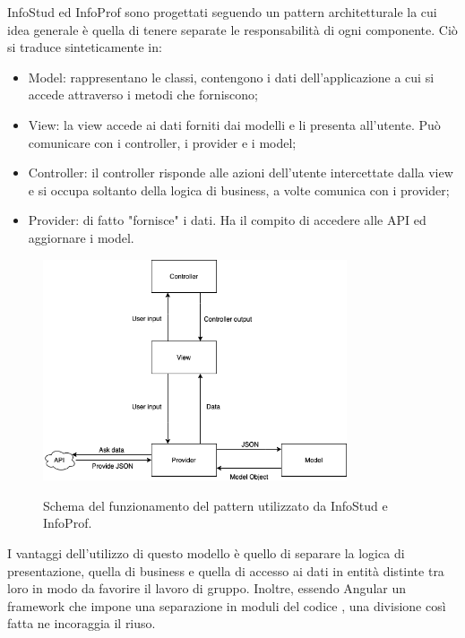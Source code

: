 \documentclass[Lau, oneside, noexaminfo]{sapthesis}%
\begin{document}
InfoStud ed InfoProf sono progettati seguendo un pattern architetturale la cui idea generale è quella di tenere separate le responsabilità di ogni componente. Ciò si traduce sinteticamente in:
\begin{itemize}
	\item Model: rappresentano le classi, contengono i dati dell'applicazione a cui si accede attraverso i metodi che forniscono;
	\item View: la view accede ai dati forniti dai modelli e li presenta all'utente. Può comunicare con i controller, i provider e i model;
	\item Controller: il controller risponde alle azioni dell'utente intercettate dalla view e si occupa soltanto della logica di business, a volte comunica con i provider;
	\item Provider: di fatto "fornisce" i dati. Ha il compito di accedere alle API ed aggiornare i model.
\end{itemize}

\begin{figure}[H]
	\caption{Schema del funzionamento del pattern utilizzato da InfoStud e InfoProf.}
	\centering
	\includegraphics[width=0.8\textwidth]{arch-pattern-img}
	\label{fig:pattern}
\end{figure}

I vantaggi dell'utilizzo di questo modello è quello di separare la logica di presentazione, quella di business e quella di accesso ai dati in entità distinte tra loro in modo da favorire il lavoro di gruppo. Inoltre, essendo Angular un framework che impone una separazione in moduli del codice \cite{ref:modules}, una divisione così fatta ne incoraggia il riuso.

\end{document}
